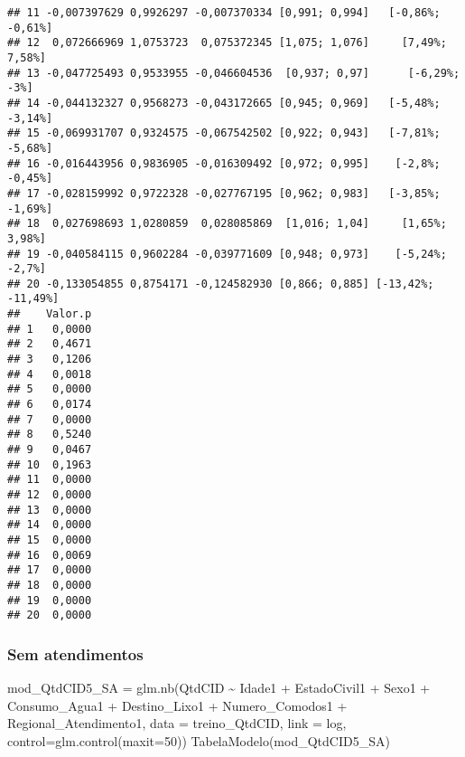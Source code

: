 \documentclass[
]{article}
\newenvironment{Shaded}{\begin{snugshade}}{\end{snugshade}}
\newcommand{\AttributeTok}[1]{\textcolor[rgb]{0.77,0.63,0.00}{#1}}
\newcommand{\DecValTok}[1]{\textcolor[rgb]{0.00,0.00,0.81}{#1}}
\newcommand{\FunctionTok}[1]{\textcolor[rgb]{0.00,0.00,0.00}{#1}}
\newcommand{\NormalTok}[1]{#1}
\newcommand{\OtherTok}[1]{\textcolor[rgb]{0.56,0.35,0.01}{#1}}
\newcommand{\SpecialCharTok}[1]{\textcolor[rgb]{0.00,0.00,0.00}{#1}}
\newcommand{\StringTok}[1]{\textcolor[rgb]{0.31,0.60,0.02}{#1}}
\begin{document}
\begin{verbatim}
## 11 -0,007397629 0,9926297 -0,007370334 [0,991; 0,994]   [-0,86%; -0,61%]
## 12  0,072666969 1,0753723  0,075372345 [1,075; 1,076]     [7,49%; 7,58%]
## 13 -0,047725493 0,9533955 -0,046604536  [0,937; 0,97]      [-6,29%; -3%]
## 14 -0,044132327 0,9568273 -0,043172665 [0,945; 0,969]   [-5,48%; -3,14%]
## 15 -0,069931707 0,9324575 -0,067542502 [0,922; 0,943]   [-7,81%; -5,68%]
## 16 -0,016443956 0,9836905 -0,016309492 [0,972; 0,995]    [-2,8%; -0,45%]
## 17 -0,028159992 0,9722328 -0,027767195 [0,962; 0,983]   [-3,85%; -1,69%]
## 18  0,027698693 1,0280859  0,028085869  [1,016; 1,04]     [1,65%; 3,98%]
## 19 -0,040584115 0,9602284 -0,039771609 [0,948; 0,973]    [-5,24%; -2,7%]
## 20 -0,133054855 0,8754171 -0,124582930 [0,866; 0,885] [-13,42%; -11,49%]
##    Valor.p
## 1   0,0000
## 2   0,4671
## 3   0,1206
## 4   0,0018
## 5   0,0000
## 6   0,0174
## 7   0,0000
## 8   0,5240
## 9   0,0467
## 10  0,1963
## 11  0,0000
## 12  0,0000
## 13  0,0000
## 14  0,0000
## 15  0,0000
## 16  0,0069
## 17  0,0000
## 18  0,0000
## 19  0,0000
## 20  0,0000
\end{verbatim}

\hypertarget{sem-atendimentos}{%
\subsubsection{Sem atendimentos}\label{sem-atendimentos}}

\begin{Shaded}
\begin{Highlighting}[]
\NormalTok{mod\_QtdCID5\_SA }\OtherTok{=} \FunctionTok{glm.nb}\NormalTok{(QtdCID }\SpecialCharTok{\textasciitilde{}}\NormalTok{ Idade1 }\SpecialCharTok{+}\NormalTok{ EstadoCivil1 }\SpecialCharTok{+}\NormalTok{ Sexo1 }\SpecialCharTok{+} 
\NormalTok{                          Consumo\_Agua1 }\SpecialCharTok{+}\NormalTok{ Destino\_Lixo1 }\SpecialCharTok{+}\NormalTok{ Numero\_Comodos1 }\SpecialCharTok{+}
\NormalTok{                          Regional\_Atendimento1, }\AttributeTok{data =}\NormalTok{ treino\_QtdCID, }\AttributeTok{link =} \StringTok{\textquotesingle{}log\textquotesingle{}}\NormalTok{, }\AttributeTok{control=}\FunctionTok{glm.control}\NormalTok{(}\AttributeTok{maxit=}\DecValTok{50}\NormalTok{))}
\FunctionTok{TabelaModelo}\NormalTok{(mod\_QtdCID5\_SA)}
\end{Highlighting}
\end{Shaded}
\end{document}
